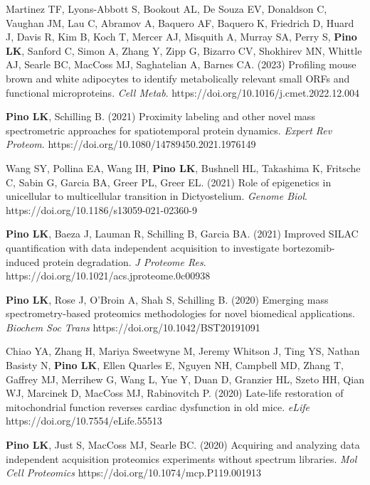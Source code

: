\documentclass[11pt]{article}
\begin{document}
\begin{etaremune}
    \item Martinez TF, Lyons-Abbott S, Bookout AL, De Souza EV, Donaldson C, Vaughan 
    JM, Lau C, Abramov A, Baquero AF, Baquero K, Friedrich D, Huard J, Davis R, Kim B, 
    Koch T, Mercer AJ, Misquith A, Murray SA, Perry S, \textbf{Pino LK}, Sanford C, 
    Simon A, Zhang Y, Zipp G, Bizarro CV, Shokhirev MN, Whittle AJ, Searle BC, MacCoss 
    MJ, Saghatelian A, Barnes CA. (2023) Profiling mouse brown and white adipocytes to 
    identify metabolically relevant small ORFs and functional microproteins. \textit{Cell 
    Metab}. https://doi.org/10.1016/j.cmet.2022.12.004

    \item \textbf{Pino LK}, Schilling B. (2021) Proximity labeling and other novel mass 
    spectrometric approaches for spatiotemporal protein dynamics. \textit{Expert Rev 
    Proteom}. https://doi.org/10.1080/14789450.2021.1976149

    \item Wang SY, Pollina EA, Wang IH, \textbf{Pino LK}, Bushnell HL, Takashima K, 
    Fritsche C, Sabin G, Garcia BA, Greer PL, Greer EL. (2021) Role of epigenetics 
    in unicellular to multicellular transition in Dictyostelium. \textit{Genome Biol}. 
    https://doi.org/10.1186/s13059-021-02360-9

    \item \textbf{Pino LK}, Baeza J, Lauman R, Schilling B, Garcia BA. (2021) Improved 
    SILAC quantification with data independent acquisition to investigate 
    bortezomib-induced protein degradation. \textit{J Proteome Res}. 
    https://doi.org/10.1021/acs.jproteome.0c00938

    \item \textbf{Pino LK}, Rose J, O’Broin A, Shah S, Schilling B. (2020) Emerging mass
    spectrometry-based proteomics methodologies for novel biomedical applications.
    \textit{Biochem Soc Trans} https://doi.org/10.1042/BST20191091
    
    \item Chiao YA, Zhang H, Mariya Sweetwyne M, Jeremy Whitson J, Ting YS, Nathan Basisty
    N, \textbf{Pino LK}, Ellen Quarles E, Nguyen NH, Campbell MD, Zhang T, Gaffrey MJ, 
    Merrihew G, Wang L, Yue Y, Duan D, Granzier HL, Szeto HH, Qian WJ, Marcinek D, MacCoss 
    MJ, Rabinovitch P. (2020) Late-life restoration of mitochondrial function reverses 
    cardiac dysfunction in old mice. \textit{eLife} https://doi.org/10.7554/eLife.55513
    
    \item \textbf{Pino LK}, Just S, MacCoss MJ, Searle BC. (2020) Acquiring and analyzing 
    data independent acquisition proteomics experiments without spectrum libraries. 
    \textit{Mol Cell Proteomics} https://doi.org/10.1074/mcp.P119.001913
    

\end{etaremune}
\end{document}
